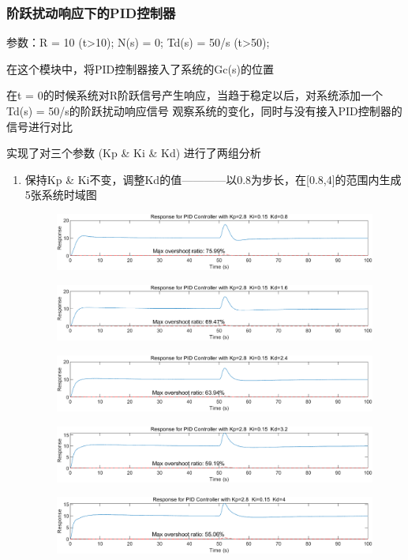 \documentclass{thuemp}
\begin{document}
\subsubsection{阶跃扰动响应下的PID控制器}
参数：R = 10 (t>10);  N(s) = 0;  Td(s) = 50/s (t>50);

在这个模块中，将PID控制器接入了系统的Gc(s)的位置

在t = 0的时候系统对R阶跃信号产生响应，当趋于稳定以后，对系统添加一个Td(s) = 50/s的阶跃扰动响应信号
观察系统的变化，同时与没有接入PID控制器的信号进行对比

实现了对三个参数 (Kp \& Ki \& Kd) 进行了两组分析
\begin{enumerate}
  \item 保持Kp \& Ki不变，调整Kd的值————以0.8为步长，在[0.8,4]的范围内生成5张系统时域图
  \begin{figure}[H]
    \centering
    \includegraphics[width=1\linewidth]{./img/PID_with_noise/pi1.png}
  \end{figure}
  \begin{figure}[H]
    \centering
    \includegraphics[width=1\linewidth]{./img/PID_with_noise/pi2.png}
  \end{figure}
  \begin{figure}[H]
    \centering
    \includegraphics[width=1\linewidth]{./img/PID_with_noise/pi3.png}
  \end{figure}
  \begin{figure}[H]
    \centering
    \includegraphics[width=1\linewidth]{./img/PID_with_noise/pi4.png}
  \end{figure}
  \begin{figure}[H]
    \centering
    \includegraphics[width=1\linewidth]{./img/PID_with_noise/pi5.png}
  \end{figure}


\end{enumerate}
\end{document}
